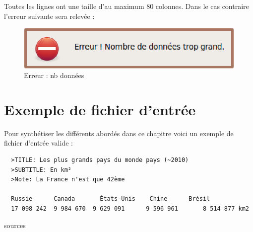 Toutes les lignes ont une taille d’au maximum 80 colonnes. Dans le cas contraire l'erreur suivante sera relevée : 
\begin{figure}[htbp]
  \centering
  \includegraphics[scale=0.40]{img/enbdonnes}
  \caption{Erreur : nb données}
  \label{fig:enbdonees}
\end{figure}



\section{Exemple de fichier d'entrée}
Pour synthétiser les différents abordés dans ce chapitre voici un exemple de fichier d'entrée valide : 
\begin{verbatim}
  >TITLE: Les plus grands pays du monde pays (~2010)
  >SUBTITLE: En km²
  >Note: La France n'est que 42ème

  Russie      Canada 	   États-Unis    Chine 	    Brésil 
  17 098 242  9 984 670  9 629 091  	9 596 961  		8 514 877 km2 	
\end{verbatim}
sources \cite{wiki}
